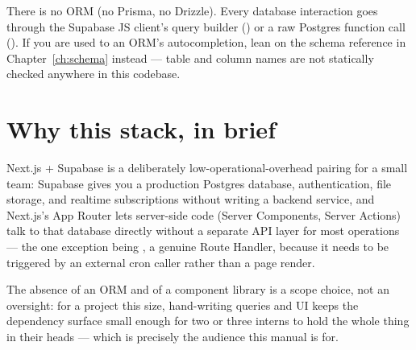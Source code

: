 \begin{olktip}
There is no ORM (no Prisma, no Drizzle). Every database interaction goes through the Supabase JS client's query builder () or a raw Postgres function call (). If you are used to an ORM's autocompletion, lean on the schema reference in Chapter~\ref{ch:schema} instead — table and column names are not statically checked anywhere in this codebase.
\end{olktip}

\section{Why this stack, in brief}

Next.js + Supabase is a deliberately low-operational-overhead pairing for a small team: Supabase gives you a production Postgres database, authentication, file storage, and realtime subscriptions without writing a backend service, and Next.js's App Router lets server-side code (Server Components, Server Actions) talk to that database directly without a separate API layer for most operations — the one exception being , a genuine Route Handler, because it needs to be triggered by an external cron caller rather than a page render.

The absence of an ORM and of a component library is a scope choice, not an oversight: for a project this size, hand-writing queries and UI keeps the dependency surface small enough for two or three interns to hold the whole thing in their heads — which is precisely the audience this manual is for.
